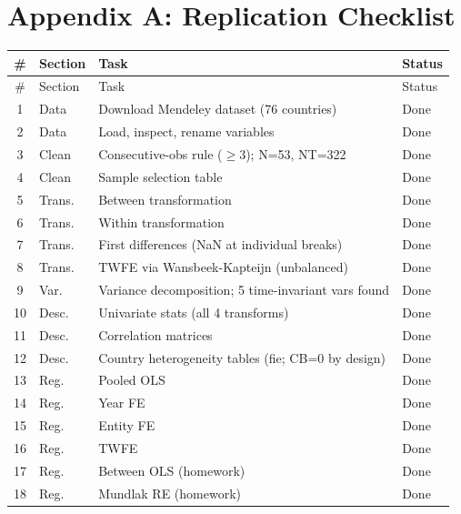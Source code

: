 \documentclass[12pt,a4paper]{article}
\begin{document}
\appendix
\section{Appendix A: Replication Checklist}

\begin{longtable}{cp{1.5cm}p{7cm}l}
\toprule
\# & Section & Task & Status \\
\midrule
\endfirsthead
\toprule
\# & Section & Task & Status \\
\midrule
\endhead
1  & Data    & Download Mendeley dataset (76 countries)             & Done \\
2  & Data    & Load, inspect, rename variables                      & Done \\
3  & Clean   & Consecutive-obs rule ($\geq 3$); N=53, NT=322        & Done \\
4  & Clean   & Sample selection table                               & Done \\
5  & Trans.  & Between transformation                               & Done \\
6  & Trans.  & Within transformation                                & Done \\
7  & Trans.  & First differences (NaN at individual breaks)         & Done \\
8  & Trans.  & TWFE via Wansbeek-Kapteijn (unbalanced)              & Done \\
9  & Var.    & Variance decomposition; 5 time-invariant vars found  & Done \\
10 & Desc.   & Univariate stats (all 4 transforms)                  & Done \\
11 & Desc.   & Correlation matrices                                 & Done \\
12 & Desc.   & Country heterogeneity tables (fie; CB=0 by design)   & Done \\
13 & Reg.    & Pooled OLS                                           & Done \\
14 & Reg.    & Year FE                                              & Done \\
15 & Reg.    & Entity FE                                            & Done \\
16 & Reg.    & TWFE                                                 & Done \\
17 & Reg.    & Between OLS (homework)                               & Done \\
18 & Reg.    & Mundlak RE (homework)                                & Done \\

\end{longtable}
\end{document}
